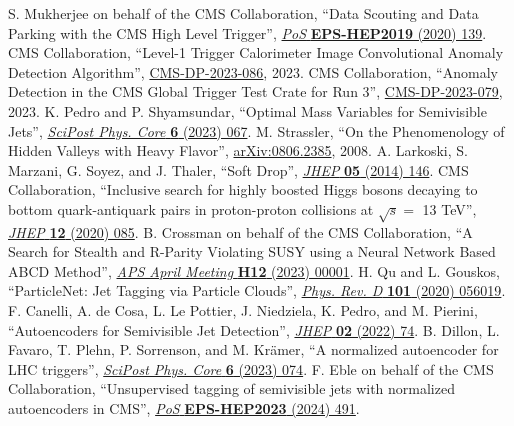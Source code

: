\begin{thebibliography}{99}
 S. Mukherjee on behalf of the CMS Collaboration, ``Data Scouting and Data Parking with the CMS High Level Trigger'', \href{https://doi.org/10.22323/1.364.0139}{\textit{PoS} \textbf{EPS-HEP2019} (2020) 139}.
 CMS Collaboration, ``Level-1 Trigger Calorimeter Image Convolutional Anomaly Detection Algorithm'', \href{http://cds.cern.ch/record/2879816}{CMS-DP-2023-086}, 2023.
 CMS Collaboration, ``Anomaly Detection in the CMS Global Trigger Test Crate for Run 3'', \href{http://cds.cern.ch/record/2876546}{CMS-DP-2023-079}, 2023.
 K. Pedro and P. Shyamsundar, ``Optimal Mass Variables for Semivisible Jets'', \href{https://doi.org/10.21468/SciPostPhysCore.6.4.067}{\textit{SciPost Phys. Core} \textbf{6} (2023) 067}.
 M. Strassler, ``On the Phenomenology of Hidden Valleys with Heavy Flavor'', \href{https://arxiv.org/abs/0806.2385}{arXiv:0806.2385}, 2008.
 A. Larkoski, S. Marzani, G. Soyez, and J. Thaler, ``Soft Drop'', \href{https://doi.org/10.1007/JHEP05(2014)146}{\textit{JHEP} \textbf{05} (2014) 146}.
 CMS Collaboration, ``Inclusive search for highly boosted Higgs bosons decaying to bottom quark-antiquark pairs in proton-proton collisions at $\sqrt{s} =$ 13 TeV'', \href{https://doi.org/10.1007/JHEP12(2020)085}{\textit{JHEP} \textbf{12} (2020) 085}.
 B. Crossman on behalf of the CMS Collaboration, ``A Search for Stealth and R-Parity Violating SUSY using a Neural Network Based ABCD Method'', \href{https://meetings.aps.org/Meeting/APR23/Session/H12.1}{\textit{APS April Meeting} \textbf{H12} (2023) 00001}.
 H. Qu and L. Gouskos, ``ParticleNet: Jet Tagging via Particle Clouds'', \href{https://doi.org/10.1103/PhysRevD.101.056019}{\textit{Phys. Rev. D} \textbf{101} (2020) 056019}.
 F. Canelli, A. de Cosa, L. Le Pottier, J. Niedziela, K. Pedro, and M. Pierini, ``Autoencoders for Semivisible Jet Detection'', \href{https://doi.org/10.1007/JHEP02(2022)074}{\textit{JHEP} \textbf{02} (2022) 74}.
 B. Dillon, L. Favaro, T. Plehn, P. Sorrenson, and M. Kr\"amer, ``A normalized autoencoder for LHC triggers'', \href{https://doi.org/10.21468/SciPostPhysCore.6.4.074}{\textit{SciPost Phys. Core} \textbf{6} (2023) 074}.
 F. Eble on behalf of the CMS Collaboration, ``Unsupervised tagging of semivisible jets with normalized autoencoders in CMS'', \href{https://doi.org/10.22323/1.449.0491}{\textit{PoS} \textbf{EPS-HEP2023} (2024) 491}.

\end{thebibliography}
